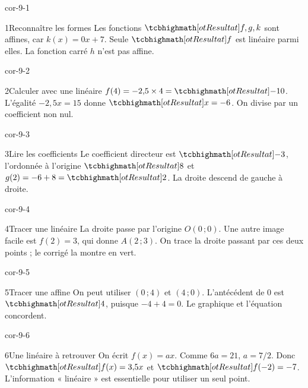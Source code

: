 \clearpage\pagestyle{otMain}\fontsize{11}{15}\selectfont{}
\begin{blocLivre}{cor-9-1}\begin{corrige}{1}{Reconnaître les formes}
Les fonctions $\res{f,g,k}$ sont affines, car $k(x)=0x+7$. Seule $\res f$ est linéaire parmi elles. La fonction carré $h$ n’est pas affine.
\end{corrige}\end{blocLivre}
\begin{blocLivre}{cor-9-2}\begin{corrige}{2}{Calculer avec une linéaire}
$f(4)=-2{,}5\times4=\res{-10}$. L’égalité $-2{,}5x=15$ donne $\res{x=-6}$. On divise par un coefficient non nul.
\end{corrige}\end{blocLivre}
\begin{blocLivre}{cor-9-3}\begin{corrige}{3}{Lire les coefficients}
Le coefficient directeur est $\res{-3}$, l’ordonnée à l’origine $\res8$ et $g(2)=-6+8=\res2$. La droite descend de gauche à droite.
\end{corrige}\end{blocLivre}
\begin{blocLivre}{cor-9-4}\begin{corrige}{4}{Tracer une linéaire}
La droite passe par l’origine $O(0\,;0)$. Une autre image facile est $f(2)=3$, qui donne $A(2\,;3)$. On trace la droite passant par ces deux points ; le corrigé la montre en vert.
\label{fig-cor-9-4}
\end{corrige}\end{blocLivre}
\begin{blocLivre}{cor-9-5}\begin{corrige}{5}{Tracer une affine}
On peut utiliser $(0\,;4)$ et $(4\,;0)$. L’antécédent de 0 est $\res4$, puisque $-4+4=0$. Le graphique et l’équation concordent.
\label{fig-cor-9-5}
\end{corrige}\end{blocLivre}
\begin{blocLivre}{cor-9-6}\begin{corrige}{6}{Une linéaire à retrouver}
On écrit $f(x)=ax$. Comme $6a=21$, $a=7/2$. Donc $\res{f(x)=3{,}5x}$ et $\res{f(-2)=-7}$. L’information « linéaire » est essentielle pour utiliser un seul point.
\end{corrige}\end{blocLivre}
